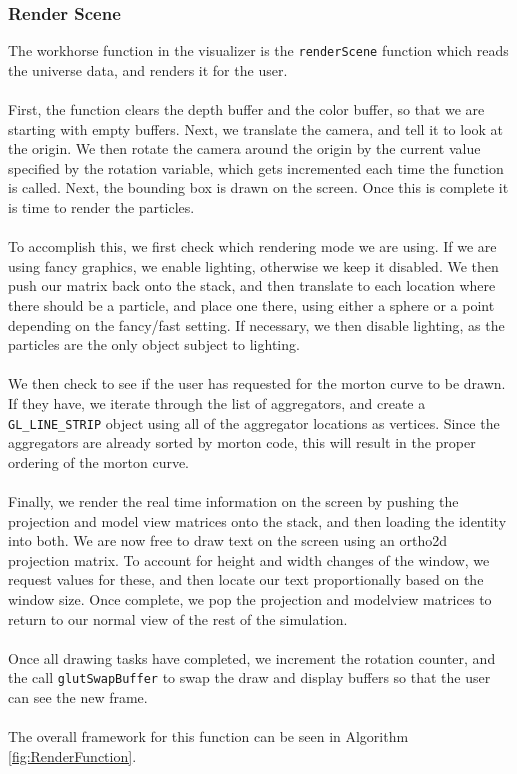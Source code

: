 \documentclass[fleqn,10pt]{UserGuideArx} %
\begin{document}
\subsubsection{Render Scene}
    The workhorse function in the visualizer is the \texttt{renderScene} function which reads the universe data, and renders it for the user. \\~\\
    First, the function clears the depth buffer and the color buffer, so that we are starting with empty buffers. Next, we translate the camera, and tell it to look at the origin. We then rotate the camera around the origin by the current value specified by the rotation variable, which gets incremented each time the function is called. Next, the bounding box is drawn on the screen. Once this is complete it is time to render the particles. \\~\\
    To accomplish this, we first check which rendering mode we are using. If we are using fancy graphics, we enable lighting, otherwise we keep it disabled. We then push our matrix back onto the stack, and then translate to each location where there should be a particle, and place one there, using either a sphere or a point depending on the fancy/fast setting. If necessary, we then disable lighting, as the particles are the only object subject to lighting.\\~\\
    We then check to see if the user has requested for the morton curve to be drawn. If they have, we iterate through the list of aggregators, and create a \texttt{GL\_LINE\_STRIP} object using all of the aggregator locations as vertices. Since the aggregators are already sorted by morton code, this will result in the proper ordering of the morton curve.\\~\\
    Finally, we render the real time information on the screen by pushing the projection and model view matrices onto the stack, and then loading the identity into both. We are now free to draw text on the screen using an ortho2d projection matrix. To account for height and width changes of the window, we request values for these, and then locate our text proportionally based on the window size. Once complete, we pop the projection and modelview matrices to return to our normal view of the rest of the simulation.\\~\\
    Once all drawing tasks have completed, we increment the rotation counter, and the call \texttt{glutSwapBuffer} to swap the draw and display buffers so that the user can see the new frame.\\~\\
    The overall framework for this function can be seen in Algorithm \ref{fig:RenderFunction}.
\end{document}
